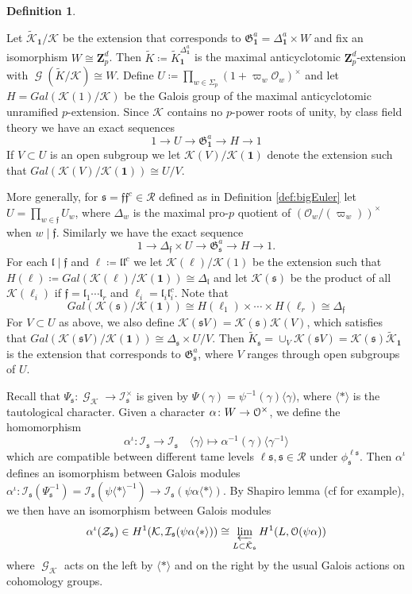 \documentclass[leqno]{amsart}
\theoremstyle{definition}
\newtheorem{defn}[thm]{Definition}
\theoremstyle{remark}
\newcommand{\id}{\mathbf{1}}
\newcommand{\oo}{\mathcal{O}}
\newcommand{\eo}{\EuScript{O}}
\newcommand{\Zp}{\mathbf{Z}_p}
\DeclareMathOperator{\Gal}{\mathcal{G}}
\newcommand{\ff}{\mathfrak{f}}
\newcommand{\fl}{\mathfrak{l}}
\newcommand{\fs}{\mathfrak{s}}
\newcommand{\K}{{\mathcal{K}}} %
\newcommand{\fG}{\mathfrak{G}}
\newcommand{\I}{\mathcal{I}} %
\begin{document}
\begin{defn}\label{def:anticyc_extn}

Let $\tilde{\K}_\id/\K$ be the extension 
that corresponds to 
$\fG^a_\id=\Delta^a_\id\times W$ and fix an isomorphism
$W\cong \Zp^d$.
Then $\tilde{K}\coloneqq \tilde{K}_\id^{\Delta^a_\id}$
is the maximal anticyclotomic $\Zp^d$-extension
with $\Gal(\tilde{K}/\K)\cong W$.
Define
$U\coloneqq \prod_{w\in\Sigma_p}(1+\varpi_w\oo_w)^\times$
and let $H=Gal(\K(1)/\K)$ be the Galois group of 
the maximal anticyclotomic unramified $p$-extension.
Since $\K$ contains no $p$-power roots of unity,
by class field theory we have an exact sequences
\[
    1\to U\to \fG_\id^a\to H\to 1
\]
If $V\subset U$ is an open subgroup
we let $\K(V)/\K(\id)$ denote the extension such that
$Gal(\K(V)/\K(\id))\cong U/V$.


More generally,
for $\fs=\ff\ff^c\in\mathcal{R}$
defined as in Definition \ref{def:bigEuler}
let $U=\prod_{w\in\ff}U_w$,
where $\Delta_w$ is the maximal pro-$p$ quotient of 
$(\oo_w/(\varpi_w))^\times$ when $w\mid \ff$.
Similarly we have the exact sequence
\[
    1\to \Delta_\ff\times U\to \fG_\fs^a\to H\to 1.
\]
For each $\fl\mid\ff$ and $\ell\coloneqq\fl\fl^c$
we let $\K(\ell)/\K(1)$ be the extension 
such that $H(\ell)\coloneqq Gal(\K(\ell)/\K(\id))\cong \Delta_{\fl}$
and let $\K(\fs)$ be the product of all $\K(\ell_i)$
if $\ff=\fl_1\cdots\fl_r$ and $\ell_i=\fl_i\fl_i^c$. Note that 
\[
    Gal(\K(\fs)/\K(\id))\cong 
    H(\ell_1)\times\cdots\times H(\ell_r)\cong \Delta_\ff
\]
For $V\subset U$ as above, 
we also define $\K(\fs V)=\K(\fs)\K(V)$,
which satisfies that 
$Gal(\K(\fs V)/\K(\id))\cong \Delta_{\fs}\times U/V$.
Then $\tilde{K}_\fs=\cup_V \K(\fs V)=\K(\fs)\tilde{\K}_\id$
is the extension that corresponds to $\fG_\fs^a$,
where $V$ ranges through open subgroups of $U$.

\end{defn}

Recall that $\Psi_\fs\colon \Gal_\K\to \I_\fs^\times$
is given by $\Psi(\gamma)=\psi^{-1}(\gamma)\langle \gamma)$,
where $\langle*\rangle$ is the tautological character.
Given a character $\alpha\colon W\to \eo^\times$,
we define the homomorphism 
\[
    \alpha^\iota\colon \I_\fs\to \I_\fs\quad
    \langle\gamma\rangle\mapsto \alpha^{-1}(\gamma)
    \langle \gamma^{-1}\rangle
\]
which are compatible between different tame levels 
$\ell\fs, \fs\in \mathcal{R}$ under $\phi^{\ell\fs}_\fs$.
Then $\alpha^\iota$ defines an isomorphism between Galois modules
$\alpha^\iota\colon \I_\fs(\Psi_\fs^{-1})=
\I_\fs(\psi\langle*\rangle^{-1})
\to \I_\fs(\psi\alpha\langle*\rangle)$.
By Shapiro lemma
(cf \cite[Lem 5.8]{Schneider2016} for example), 
we then have an isomorphism between Galois modules
\begin{equation}\label{eq:Shapiro}
    \alpha^\iota(\mathcal{Z}_\fs) \in 
    H^1(\K, \I_\fs(\psi\alpha\langle*\rangle))\cong 
    \varprojlim_{L\subset \tilde{\K}_\fs}
    H^1(L, \eo(\psi\alpha))
\end{equation}
where $\Gal_\K$ acts on the left by $\langle*\rangle$
and on the right by the usual 
Galois actions on cohomology groups.
\end{document}
